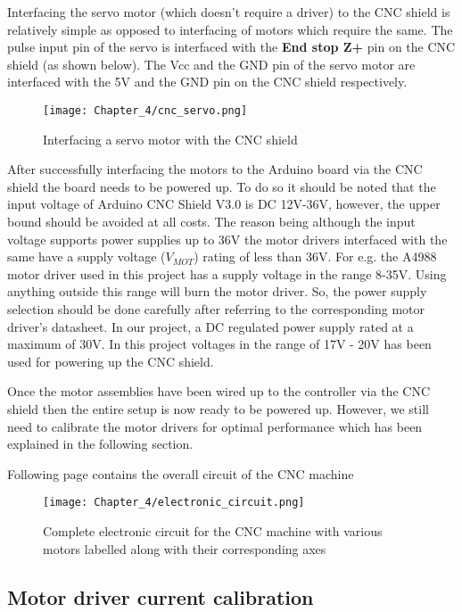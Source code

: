 Interfacing the servo motor (which doesn’t require a driver) to the CNC shield is relatively simple as opposed to interfacing of motors which require the same. The pulse input pin of the servo is interfaced with the \textbf{End stop Z+} pin on the CNC shield (as shown below). The Vcc and the GND pin of the servo motor are interfaced with the 5V and the GND pin on the CNC shield respectively. \par

\begin{figure}[h]
 \centering
 \texttt{[image: Chapter\_4/cnc\_servo.png]}
 \caption{Interfacing a servo motor with the CNC shield}
 \label{fig:cnc_servo}
\end{figure}

After successfully interfacing the motors to the Arduino board via the CNC shield the board needs to be powered up. To do so it should be noted that the input voltage of Arduino CNC Shield V3.0 is DC 12V-36V, however, the upper bound should be avoided at all costs. The reason being although the input voltage supports power supplies up to 36V the motor drivers interfaced with the same have a supply voltage ($V_{MOT}$) rating of less than 36V. For e.g. the A4988 motor driver used in this project has a supply voltage in the range 8-35V. Using anything outside this range will burn the motor driver. So, the power supply selection should be done carefully after referring to the corresponding motor driver’s datasheet. In our project, a DC regulated power supply rated at a maximum of 30V. In this project voltages in the range of 17V - 20V has been used for powering up the CNC shield. \par

Once the motor assemblies have been wired up to the controller via the CNC shield then the entire setup is now ready to be powered up. However, we still need to calibrate the motor drivers for optimal performance which has been explained in the following section.

Following page contains the overall circuit of the CNC machine \pagebreak

\begin{figure}[h]
    \centering
    \texttt{[image: Chapter\_4/electronic\_circuit.png]}
    \caption{Complete electronic circuit for the CNC machine with various motors labelled along with their corresponding axes}
    \label{fig:electronic_circuit}
\end{figure}


\subsection{Motor driver current calibration}

